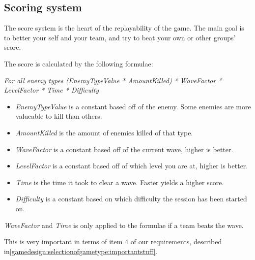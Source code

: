 \subsection{Scoring system}\label{gamedesign:ourgame:scoring}
The score system is the heart of the replayability of the game. The main goal is to better your self and your team, and try to beat your own or other groups' score.

The score is calculated by the following formulae:
\begin{center}
\textit{For all enemy types (EnemyTypeValue * AmountKilled) * WaveFactor * LevelFactor * Time * Difficulty}
\end{center}
\begin{itemize}
\item \textit{EnemyTypeValue} is a constant based off of the enemy. Some enemies are more valueable to kill than others.
\item \textit{AmountKilled} is the amount of enemies killed of that type.
\item \textit{WaveFactor} is a constant based off of the current wave, higher is better.
\item \textit{LevelFactor} is a constant based off of which level you are at, higher is better.
\item \textit{Time} is the time it took to clear a wave. Faster yields a higher score.
\item \textit{Difficulty} is a constant based on which difficulty the session has been started on.
\end{itemize}

\emph{WaveFactor} and \emph{Time} is only applied to the formulae if a team beats the wave.

This is very important in terms of item 4 of our requirements, described in\ref{gamedesign:selectionofgametype:importantstuff}.
